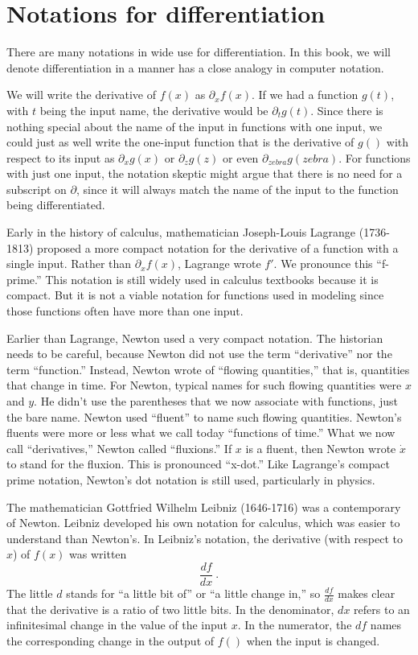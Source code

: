 \documentclass[
  letterpaper,
  DIV=11,
  numbers=noendperiod,
  oneside]{scrreprt}
\begin{document}
\hypertarget{notations-for-differentiation}{%
\section{Notations for
differentiation}\label{notations-for-differentiation}}

There are many notations in wide use for differentiation. In this book,
we will denote differentiation in a manner has a close analogy in
computer notation.

We will write the derivative of \(f(x)\) as \(\partial_x f(x)\). If we
had a function \(g(t)\), with \(t\) being the input name, the derivative
would be \(\partial_t g(t)\). Since there is nothing special about the
name of the input in functions with one input, we could just as well
write the one-input function that is the derivative of \(g()\) with
respect to its input as \(\partial_x g(x)\) or \(\partial_z g(z)\) or
even \(\partial_{zebra} g(zebra)\). For functions with just one input,
the notation skeptic might argue that there is no need for a subscript
on \(\partial\), since it will always match the name of the input to the
function being differentiated.

Early in the history of calculus, mathematician Joseph-Louis Lagrange
(1736-1813) proposed a more compact notation for the derivative of a
function with a single input. Rather than \(\partial_x f(x)\), Lagrange
wrote \(f'\). We pronounce this ``f-prime.'' This notation is still
widely used in calculus textbooks because it is compact. But it is not a
viable notation for functions used in modeling since those functions
often have more than one input.

Earlier than Lagrange, Newton used a very compact notation. The
historian needs to be careful, because Newton did not use the term
``derivative'' nor the term ``function.'' Instead, Newton wrote of
``flowing quantities,'' that is, quantities that change in time. For
Newton, typical names for such flowing quantities were \(x\) and \(y\).
He didn't use the parentheses that we now associate with functions, just
the bare name. Newton used ``fluent'' to name such flowing quantities.
Newton's fluents were more or less what we call today ``functions of
time.'' What we now call ``derivatives,'' Newton called ``fluxions.'' If
\(x\) is a fluent, then Newton wrote \(\dot{x}\) to stand for the
fluxion. This is pronounced ``x-dot.'' Like Lagrange's compact prime
notation, Newton's dot notation is still used, particularly in physics.

The mathematician Gottfried Wilhelm Leibniz (1646-1716) was a
contemporary of Newton. Leibniz developed his own notation for calculus,
which was easier to understand than Newton's. In Leibniz's notation, the
derivative (with respect to \(x\)) of \(f(x)\) was written
\[\frac{df}{dx}\ .\] The little \(d\) stands for ``a little bit of'' or
``a little change in,'' so \(\frac{df}{dx}\) makes clear that the
derivative is a ratio of two little bits. In the denominator, \(dx\)
refers to an infinitesimal change in the value of the input \(x\). In
the numerator, the \(df\) names the corresponding change in the output
of \(f()\) when the input is changed.
\end{document}
